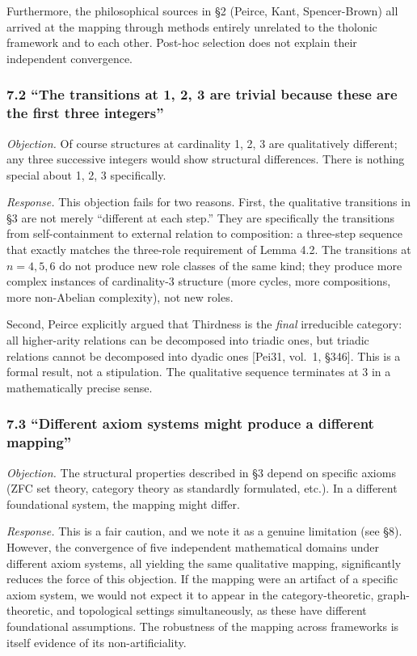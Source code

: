 \documentclass[
  11pt,
  letterpaper,
]{article}
\begin{document}
Furthermore, the philosophical sources in §2 (Peirce, Kant,
Spencer-Brown) all arrived at the mapping through methods entirely
unrelated to the tholonic framework and to each other. Post-hoc
selection does not explain their independent convergence.

\subsubsection{7.2 ``The transitions at 1, 2, 3 are trivial because
these are the first three
integers''}\label{the-transitions-at-1-2-3-are-trivial-because-these-are-the-first-three-integers}

\emph{Objection.} Of course structures at cardinality 1, 2, 3 are
qualitatively different; any three successive integers would show
structural differences. There is nothing special about 1, 2, 3
specifically.

\emph{Response.} This objection fails for two reasons. First, the
qualitative transitions in §3 are not merely ``different at each step.''
They are specifically the transitions from self-containment to external
relation to composition: a three-step sequence that exactly matches the
three-role requirement of Lemma 4.2. The transitions at \(n = 4, 5, 6\)
do not produce new role classes of the same kind; they produce more
complex instances of cardinality-3 structure (more cycles, more
compositions, more non-Abelian complexity), not new roles.

Second, Peirce explicitly argued that Thirdness is the \emph{final}
irreducible category: all higher-arity relations can be decomposed into
triadic ones, but triadic relations cannot be decomposed into dyadic
ones {[}Pei31, vol.~1, §346{]}. This is a formal result, not a
stipulation. The qualitative sequence terminates at 3 in a
mathematically precise sense.

\subsubsection{7.3 ``Different axiom systems might produce a different
mapping''}\label{different-axiom-systems-might-produce-a-different-mapping}

\emph{Objection.} The structural properties described in §3 depend on
specific axioms (ZFC set theory, category theory as standardly
formulated, etc.). In a different foundational system, the mapping might
differ.

\emph{Response.} This is a fair caution, and we note it as a genuine
limitation (see §8). However, the convergence of five independent
mathematical domains under different axiom systems, all yielding the
same qualitative mapping, significantly reduces the force of this
objection. If the mapping were an artifact of a specific axiom system,
we would not expect it to appear in the category-theoretic,
graph-theoretic, and topological settings simultaneously, as these have
different foundational assumptions. The robustness of the mapping across
frameworks is itself evidence of its non-artificiality.
\end{document}
